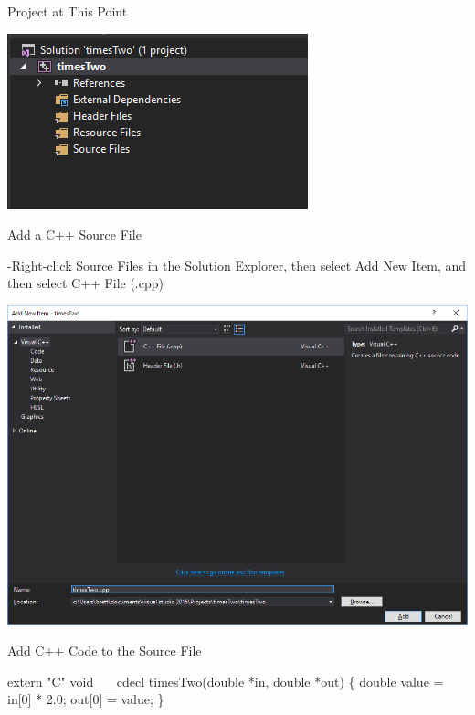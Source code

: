 \documentclass[ignorenonframetext,]{beamer}
\newenvironment{Shaded}{\begin{snugshade}}{\end{snugshade}}
\newcommand{\DataTypeTok}[1]{\textcolor[rgb]{0.13,0.29,0.53}{{#1}}}
\newcommand{\DecValTok}[1]{\textcolor[rgb]{0.00,0.00,0.81}{{#1}}}
\newcommand{\FloatTok}[1]{\textcolor[rgb]{0.00,0.00,0.81}{{#1}}}
\newcommand{\StringTok}[1]{\textcolor[rgb]{0.31,0.60,0.02}{{#1}}}
\newcommand{\NormalTok}[1]{{#1}}
\begin{document}
\begin{frame}{Project at This Point}

\centerline{
  \includegraphics[width=\textwidth,height=0.7\textheight,keepaspectratio]{./projectToPoint}
}

\end{frame}

\begin{frame}{Add a C++ Source File}

-Right-click Source Files in the Solution Explorer, then select Add New
Item, and then select C++ File (.cpp)

\centerline{
  \includegraphics[width=\textwidth,height=0.7\textheight,keepaspectratio]{./addNewItem}
}

\end{frame}

\begin{frame}[fragile]{Add C++ Code to the Source File}

\LARGE

\begin{Shaded}
\begin{Highlighting}[]
\DataTypeTok{extern} \StringTok{"C"} \DataTypeTok{void} \NormalTok{__cdecl }
  \NormalTok{timesTwo(}\DataTypeTok{double} \NormalTok{*in, }\DataTypeTok{double} \NormalTok{*out)}
\NormalTok{\{}
  \DataTypeTok{double} \NormalTok{value = in[}\DecValTok{0}\NormalTok{] * }\FloatTok{2.0}\NormalTok{;}
    \NormalTok{out[}\DecValTok{0}\NormalTok{] = value;}
\NormalTok{\}}
\end{Highlighting}
\end{Shaded}

\end{frame}
\end{document}
